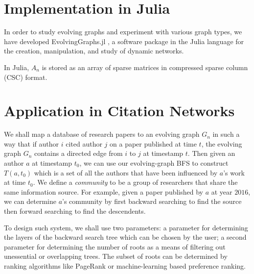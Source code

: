 \documentclass[11pt, conference, , compsocconf]{IEEEtran}
\theoremstyle{definition}
\begin{document}

\section{Implementation in Julia}
\label{sec:implementation-julia}

In order to study evolving graphs and experiment with various graph types, we have developed EvolvingGraphs.jl \cite{zhang15}, a software package in the Julia language \cite{bkse12} for the creation, manipulation, and study of dynamic networks.  

In Julia,  $A_n$ is stored as an array of sparse matrices in compressed sparse column (CSC) format. 

\section{Application in Citation Networks}
\label{sec:applications}

We shall map a database of research papers to an evolving graph $G_n$
in such a way that if author $i$ cited author $j$ on a paper published
at  time $t$, the evolving graph $G_n$ contains a directed edge from
$i$ to $j$ at timestamp $t$. Then given an author $a$ at timestamp $t_0$,
we can use our evolving-graph BFS to construct $T(a, t_0)$ which is 
a set of all the authors that have been influenced by $a$'s work at  
time $t_0$. We define a \emph{community} to be a group of 
researchers that share the same information source. 
For example, given a paper published by $a$ at year $2016$, 
we can determine $a$'s community by first backward searching to 
find the source then forward searching to find the descendents.

To design such system, we shall use two parameters: 
 a parameter for 
determining the layers of the backward search tree which can be chosen by the user;
a second parameter for determining the number of roots as a means of 
filtering out unessential or overlapping trees. The subset of roots can be determined
by ranking algorithms like PageRank or machine-learning based preference ranking. 
\end{document}
